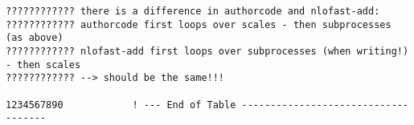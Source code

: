 {\begin{verbatim}
???????????? there is a difference in authorcode and nlofast-add:
???????????? authorcode first loops over scales - then subprocesses (as above)
???????????? nlofast-add first loops over subprocesses (when writing!) - then scales
???????????? --> should be the same!!!

1234567890            ! --- End of Table ------------------------------------
\end{verbatim}
}


